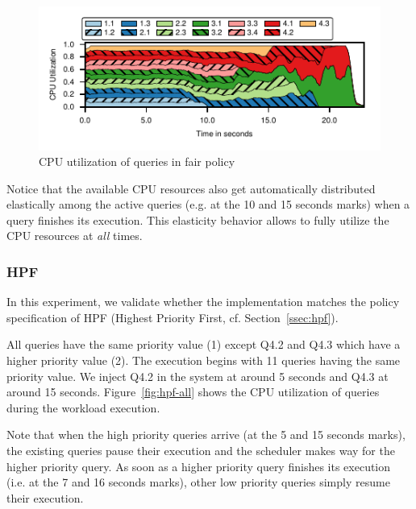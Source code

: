 \begin{figure}[t]
	\centering
	\includegraphics[width=\columnwidth]{figures/ssb-all-uniform-fair-cpu-util.pdf}
	\vspace{-2.5em}
	\caption{CPU utilization of queries in fair policy}
	\label{fig:fair-cpu-util}
\end{figure}

Notice that the available CPU resources also get automatically distributed elastically among the active queries (e.g. at the 10 and 15 seconds marks) when a query finishes its execution. 
This elasticity behavior allows \sys{} to fully utilize the CPU resources at \textit{all} times.
\subsubsection{HPF}
In this experiment, we validate whether the implementation matches the policy 
specification of HPF (Highest Priority First, cf. Section~\ref{ssec:hpf}).

All queries have the same priority value (1) except Q4.2 and Q4.3 which have a higher priority value (2). 
The execution begins with 11 queries having the same priority value. %
We inject Q4.2 in the system at around 5 seconds and Q4.3 at around 15 seconds.
Figure~\ref{fig:hpf-all} shows the CPU utilization of queries during the workload 
execution.

Note that when the high priority queries arrive (at the 5 and 15 seconds marks), the existing queries pause their execution and the scheduler makes way for the higher priority query.
As soon as a higher priority query finishes its execution (i.e. at the 7 and 16 seconds marks), other low priority queries simply resume their execution.

